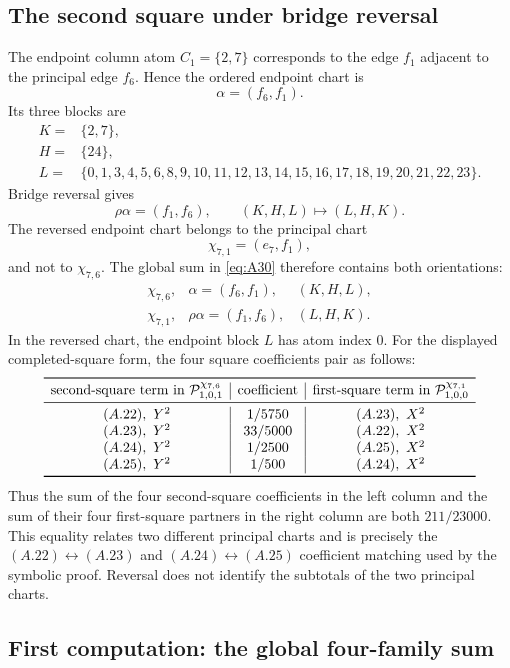 \subsection{The second square under bridge reversal}

The endpoint column atom $C_1=\{2,7\}$ corresponds to the edge $f_1$
adjacent to the principal edge $f_6$.  Hence the ordered endpoint chart is
\[
 \alpha=(f_6,f_1).
\]
Its three blocks are
\[
\begin{aligned}
K={}&\{2,7\},\\
H={}&\{24\},\\
L={}&\{0,1,3,4,5,6,8,9,10,11,12,13,14,15,16,17,18,19,20,21,22,23\}.
\end{aligned}
\]
Bridge reversal gives
\[
 \rho\alpha=(f_1,f_6),
 \qquad
 (K,H,L)\longmapsto(L,H,K).
\]
The reversed endpoint chart belongs to the principal chart
\[
 \chi_{7,1}=(e_7,f_1),
\]
and not to $\chi_{7,6}$.  The global sum in \eqref{eq:A30} therefore contains both
orientations:
\[
\begin{array}{lll}
\chi_{7,6},&\alpha=(f_6,f_1),&(K,H,L),\\
\chi_{7,1},&\rho\alpha=(f_1,f_6),&(L,H,K).
\end{array}
\]
In the reversed chart, the endpoint block $L$ has atom index $0$.  For the
displayed completed-square form, the four square coefficients pair as follows:
\[
\begin{array}{c|c|c}
\toprule
\text{second-square term in }\mathcal P^{\chi_{7,6}}_{1,0,1}
&\text{coefficient}
&\text{first-square term in }\mathcal P^{\chi_{7,1}}_{1,0,0}\\
\midrule
(A.22),\ Y^2&1/5750&(A.23),\ X^2\\
(A.23),\ Y^2&33/5000&(A.22),\ X^2\\
(A.24),\ Y^2&1/2500&(A.25),\ X^2\\
(A.25),\ Y^2&1/500&(A.24),\ X^2\\
\bottomrule
\end{array}
\]
Thus the sum of the four second-square coefficients in the left column and
the sum of their four first-square partners in the right column are both
$211/23000$.  This equality relates two different principal charts and is
precisely the
$(A.22)\leftrightarrow(A.23)$ and $(A.24)\leftrightarrow(A.25)$ coefficient
matching used by the symbolic proof.  Reversal does not identify the
subtotals of the two principal charts.

\subsection{First computation: the global four-family sum}

